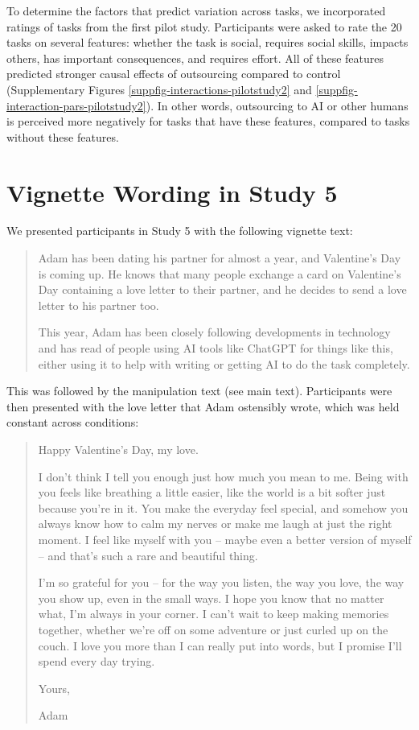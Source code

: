 \documentclass[
  man,
  floatsintext,
  longtable,
  nolmodern,
  notxfonts,
  notimes,
  colorlinks=true,linkcolor=blue,citecolor=blue,urlcolor=blue]{apa7}
\begin{document}
To determine the factors that predict variation across tasks, we
incorporated ratings of tasks from the first pilot study. Participants
were asked to rate the 20 tasks on several features: whether the task is
social, requires social skills, impacts others, has important
consequences, and requires effort. All of these features predicted
stronger causal effects of outsourcing compared to control
(Supplementary Figures \ref{suppfig-interactions-pilotstudy2} and
\ref{suppfig-interaction-pars-pilotstudy2}). In other words, outsourcing
to AI or other humans is perceived more negatively for tasks that have
these features, compared to tasks without these features.

\newpage

\section{Vignette Wording in Study 5}\label{vignette-wording-in-study-5}

\noindent We presented participants in Study 5 with the following
vignette text:

\begin{quote}
Adam has been dating his partner for almost a year, and Valentine's Day
is coming up. He knows that many people exchange a card on Valentine's
Day containing a love letter to their partner, and he decides to send a
love letter to his partner too.

This year, Adam has been closely following developments in technology
and has read of people using AI tools like ChatGPT for things like this,
either using it to help with writing or getting AI to do the task
completely.
\end{quote}

\noindent This was followed by the manipulation text (see main text).
Participants were then presented with the love letter that Adam
ostensibly wrote, which was held constant across conditions:

\begin{quote}
Happy Valentine's Day, my love.

I don't think I tell you enough just how much you mean to me. Being with
you feels like breathing a little easier, like the world is a bit softer
just because you're in it. You make the everyday feel special, and
somehow you always know how to calm my nerves or make me laugh at just
the right moment. I feel like myself with you -- maybe even a better
version of myself -- and that's such a rare and beautiful thing.

I'm so grateful for you -- for the way you listen, the way you love, the
way you show up, even in the small ways. I hope you know that no matter
what, I'm always in your corner. I can't wait to keep making memories
together, whether we're off on some adventure or just curled up on the
couch. I love you more than I can really put into words, but I promise
I'll spend every day trying.

Yours,

Adam
\end{quote}
\end{document}
